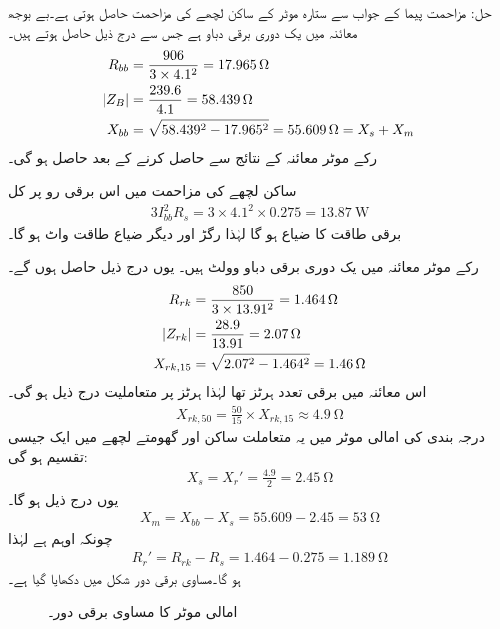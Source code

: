 حل:\quad
مزاحمت پیما کے جواب سے  ستارہ موٹر کے ساکن لچھے کی مزاحمت  حاصل ہوتی ہے۔بے بوجھ معائنہ میں یک دوری برقی دباو  ہے جس سے درج ذیل حاصل ہوتے ہیں۔
\begin{align*}
R_{bb} &=\frac{906}{3 \times 4.1^2}=\SI{17.965}{\ohm}\\
\abs{Z_B}&=\frac{239.6}{4.1}=\SI{58.439}{\ohm}\\
X_{bb}&=\sqrt{58.439^2-17.965^2}=\SI{55.609}{\ohm}=X_s+X_m
\end{align*}
رکے موٹر معائنہ کے نتائج سے  حاصل کرنے کے بعد  حاصل ہو گی۔

ساکن لچھے کی مزاحمت میں اس برقی رو پر کل
\begin{align*}
3 I_{bb}^2 R_s=3 \times 4.1^2 \times  0.275=\SI{13.87}{\watt}
\end{align*}
برقی طاقت کا ضیاع ہو گا لہٰذا رگڑ اور دیگر ضیاع طاقت  واٹ ہو گا۔

رکے موٹر معائنہ میں یک دوری برقی دباو  وولٹ ہیں۔ یوں درج ذیل حاصل ہوں گے۔
\begin{align*}
R_{rk}&=\frac{850}{3 \times 13.91^2}=\SI{1.464}{\ohm}\\
\abs{Z_{rk}}&=\frac{28.9}{13.91}=\SI{2.07}{\ohm}\\
X_{rk, 15}&=\sqrt{2.07^2-1.464^2}=\SI{1.46}{\ohm}
\end{align*}
اس معائنہ میں برقی تعدد  ہرٹز تھا لہٰذا  ہرٹز پر متعاملیت درج ذیل ہو گی۔
\begin{align*}
X_{rk,50}=\frac{50}{15} \times X_{rk,15} \approx \SI{4.9}{\ohm}
\end{align*}
درجہ بندی  کی امالی موٹر میں یہ متعاملت ساکن اور گھومتے لچھے میں ایک جیسی تقسیم ہو گی:
\begin{align*}
X_s=X_r'=\frac{4.9}{2}=\SI{2.45}{\ohm}
\end{align*}
یوں درج ذیل ہو گا۔
\begin{align*}
X_m=X_{bb}-X_s=55.609-2.45=\SI{53}{\ohm}
\end{align*}
چونکہ   اوہم ہے  لہٰذا
\begin{align*}
R_r'=R_{rk}-R_s=1.464-0.275=\SI{1.189}{\ohm}
\end{align*}
ہو گا۔مساوی برقی دور شکل  میں دکھایا گیا ہے۔
\begin{figure}
\centering
\caption{امالی موٹر کا مساوی برقی دور۔}
\label{شکل_امالی_موٹر_مثال_کا_دور}
\end{figure}

